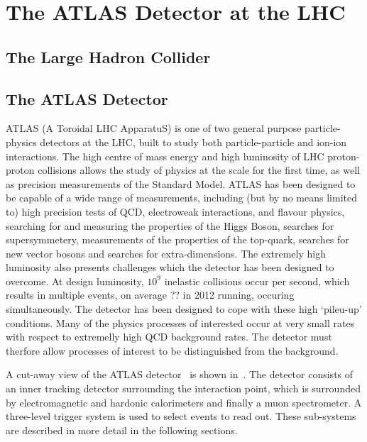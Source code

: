 \graphicspath{{Chapters/Detector/Figures/}}
\chapter{The ATLAS Detector at the LHC}
\label{chap:Detector}

\section{The Large Hadron Collider}

\section{The ATLAS Detector}

ATLAS (A Toroidal LHC ApparatuS) is one of two general purpose particle-physics
detectors at the LHC, built to study both particle-particle and ion-ion
interactions. The high centre of mass energy and high luminosity of LHC proton-proton collisions
allows the study of physics at the \tev scale for the first time, as well as
precision measurements of the Standard Model. ATLAS has been designed to be
capable of a wide range of measurements, including (but by no means limited to)
high precision tests of QCD, electroweak interactions, and flavour physics, searching for and measuring
the properties of the Higgs Boson, searches for supersymmetery, measurements
of the properties of the top-quark, searches for new vector bosons and searches
for extra-dimensions. The extremely high luminosity also presents challenges which
the detector has been designed to overcome. At design luminosity, $10^9$
inelastic collisions occur per second, which results in multiple events, on average ?? in 2012 running, occuring
simultaneously. The detector has been designed to cope with these high
`pileu-up' conditions. Many of the physics processes of interested occur at very
small rates with respect to extremelly high QCD background rates. The detector
must therfore allow processes of interest to be distinguished from the
background.

A cut-away view of the ATLAS detector~\cite{1748-0221-3-08-S08003} is shown in~. The detector consists
of an inner tracking detector surrounding the interaction point, which is
surrounded by electromagnetic and hardonic calorimeters and finally a muon
spectrometer. A three-level trigger system is used to select events to read out.
These sub-systems are described in more detail in the following
sections. 


